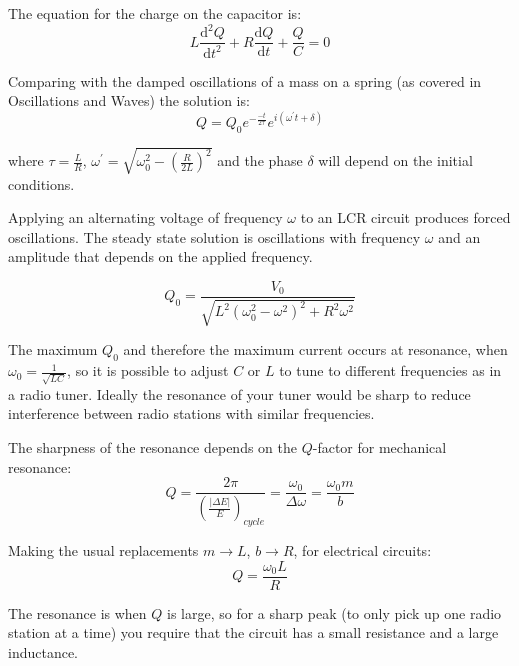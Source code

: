\documentclass[
]{book}
\numberwithin{equation}{section}
\begin{document}
The equation for the charge on the capacitor is:
\begin{equation}
\label{eq:diffEqQ}
L \frac{ \mathrm{d}^2 Q}{\mathrm{d} t^2} + R \frac{\mathrm{d} Q}{\mathrm{d} t} + \frac{Q}{C} = 0
\end{equation}

Comparing with the damped oscillations of a mass on a spring (as covered
in Oscillations and Waves) the solution is:
\begin{equation}
\label{eq:Qsol}
Q = Q_0 e^{ - \frac{-t}{2\tau} } e^{i(\omega^{'} t + \delta)}
\end{equation}

where \(\tau = \frac{L}{R}\),
\(\omega^{'} = \sqrt{ \omega_0^2 - \left( \frac{R}{2 L} \right)^2}\) and
the phase \(\delta\) will depend on the initial conditions.

Applying an alternating voltage of frequency \(\omega\) to an LCR circuit
produces forced oscillations. The steady state solution is oscillations
with frequency \(\omega\) and an amplitude that depends on the applied
frequency.

\begin{equation}
\label{eq:Q0}
Q_0 = \frac{V_0}{\sqrt{ L^2 (\omega_0^2 - \omega^2)^2 + R^2 \omega^2 }}
\end{equation}

The maximum \(Q_0\) and therefore the maximum current occurs at resonance,
when \(\omega_0 = \frac{1}{\sqrt{LC}}\), so it is possible to adjust \(C\)
or \(L\) to tune to different frequencies as in a radio tuner. Ideally the
resonance of your tuner would be sharp to reduce interference between
radio stations with similar frequencies.

The sharpness of the resonance depends on the \(Q\)-factor for mechanical
resonance:
\begin{equation}
\label{eq:Qfactor}
Q = \frac{2\pi}{ \left( \frac{|\Delta E|}{E} \right)_{cycle} } = \frac{\omega_0}{\Delta \omega} = \frac{\omega_0 m}{b}
\end{equation}

Making the usual replacements \(m \rightarrow L\), \(b \rightarrow R\), for
electrical circuits:
\begin{equation}
\label{eq:QvsOmega}
Q = \frac{\omega_0 L}{R}
\end{equation}

The resonance is when \(Q\) is large, so for a sharp peak (to only pick up
one radio station at a time) you require that the circuit has a small
resistance and a large inductance.
\end{document}
